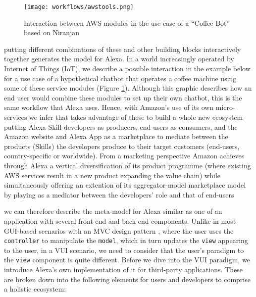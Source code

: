 
\begin{figure}[h]
	\caption[Interaction Between AWS Modules (Coffee Bot)]{Interaction between AWS modules in the use case of a ``Coffee Bot'' based on Niranjan \cite{aws:lex_webinar} }\label{lex_interactionExample}
	\centering
	\texttt{[image: workflows/awstools.png]}
\end{figure}
%

putting different combinations of these and other building blocks interactively together generates the model for Alexa. In a world increasingly operated by Internet of Things (IoT), we describe a possible interaction in the example below for a use case of a hypothetical chatbot that operates a coffee machine using some of these service modules (Figure \ref{lex_interactionExample}).  Although this graphic describes how an end user would combine these modules to set up their own chatbot, this is the same workflow that Alexa uses. Hence, with Amazon's use of its own micro-services we infer that takes advantage of these to build a whole new ecosystem putting Alexa Skill developers as producers, end-users as consumers, and the Amazon website and Alexa App as a marketplace to mediate between the products (Skills) the developers produce to their target customers (end-users, country-specific or worldwide). From a marketing perspective Amazon achieves through Alexa a vertical diversification of its product programme (where existing AWS services result in a new product expanding the value chain) while simultaneously offering an extention of its aggregator-model marketplace model by playing as a mediator between the developers' role and that of end-users %




we can therefore describe the meta-model for Alexa similar as one %
of an application with several front-end and back-end components. Unlike in most GUI-based scenarios with an MVC design pattern \cite{wiki:mvc}, where the user uses the \lstinline|controller| to manipulate the \lstinline|model|, which in turn updates the \lstinline|view| appearing to the user, in a VUI scenario, we need to consider that the user's paradigm to the \lstinline|view| component is quite different. Before we dive into the VUI paradigm, we introduce Alexa's own implementation of it for third-party applications. These are broken down into the following elements for users and developers to comprise a holistic ecosystem:




